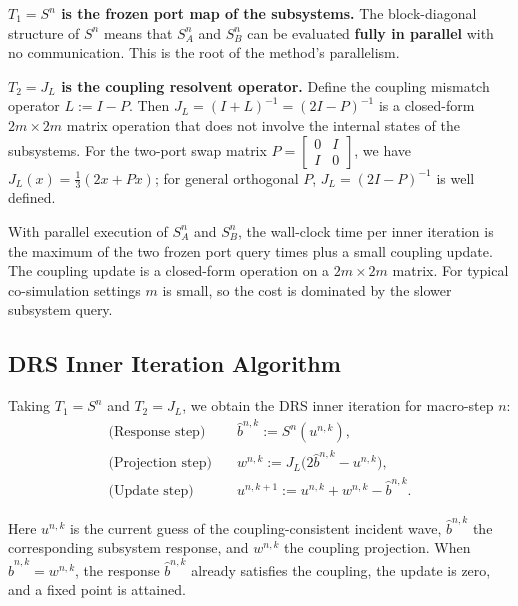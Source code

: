 \textbf{$T_1 = S^n$ is the frozen port map of the subsystems.} The block-diagonal structure of $S^n$ means that $S_A^n$ and $S_B^n$ can be evaluated \textbf{fully in parallel} with no communication. This is the root of the method's parallelism.

\textbf{$T_2 = J_L$ is the coupling resolvent operator.} Define the coupling mismatch operator $L := I - P$. Then $J_L = (I+L)^{-1} = (2I-P)^{-1}$ is a closed-form $2m \times 2m$ matrix operation that does not involve the internal states of the subsystems. For the two-port swap matrix $P = \begin{bmatrix} 0 & I \\ I & 0 \end{bmatrix}$, we have $J_L(x) = \frac{1}{3}(2x + Px)$; for general orthogonal $P$, $J_L = (2I-P)^{-1}$ is well defined.

With parallel execution of $S_A^n$ and $S_B^n$, the wall-clock time per inner iteration is the maximum of the two frozen port query times plus a small coupling update. The coupling update is a closed-form operation on a $2m \times 2m$ matrix. For typical co-simulation settings $m$ is small, so the cost is dominated by the slower subsystem query.

\subsection{DRS Inner Iteration Algorithm}
\label{subsec:drs_inner_iteration}

Taking $T_1 = S^n$ and $T_2 = J_L$, we obtain the DRS inner iteration for macro-step $n$:
\begin{equation}
\begin{aligned}
\text{(Response step)}\quad &\hat{b}^{n,k} := S^n(u^{n,k}), \\[4pt]
\text{(Projection step)}\quad &w^{n,k} := J_L\big(2\hat{b}^{n,k} - u^{n,k}\big), \\[4pt]
\text{(Update step)}\quad &u^{n,k+1} := u^{n,k} + w^{n,k} - \hat{b}^{n,k}.
\end{aligned}
\label{eq:drs_inner_iteration}
\end{equation}

Here $u^{n,k}$ is the current guess of the coupling-consistent incident wave, $\hat{b}^{n,k}$ the corresponding subsystem response, and $w^{n,k}$ the coupling projection. 
When $\hat{b}^{n,k} = w^{n,k}$, the response $\hat{b}^{n,k}$ already satisfies the coupling, the update is zero, and a fixed point is attained.

